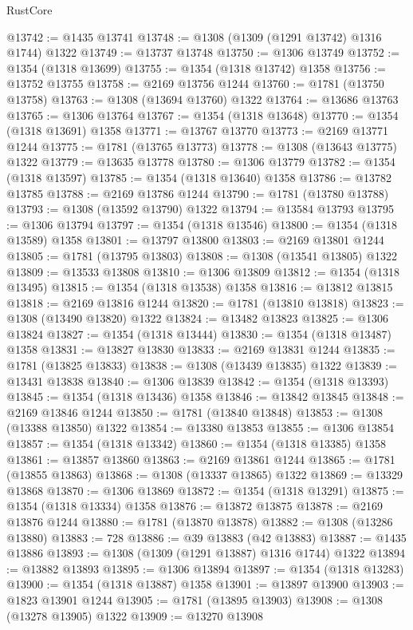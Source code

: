 \begin{lexlean}{RustCore}
\begin{coremodule}
@13742 := @1435 @13741
@13748 := @1308 (@1309 (@1291 @13742) @1316 @1744) @1322
@13749 := @13737 @13748
@13750 := @1306 @13749
@13752 := @1354 (@1318 @13699)
@13755 := @1354 (@1318 @13742) @1358
@13756 := @13752 @13755
@13758 := @2169 @13756 @1244
@13760 := @1781 (@13750 @13758)
@13763 := @1308 (@13694 @13760) @1322
@13764 := @13686 @13763
@13765 := @1306 @13764
@13767 := @1354 (@1318 @13648)
@13770 := @1354 (@1318 @13691) @1358
@13771 := @13767 @13770
@13773 := @2169 @13771 @1244
@13775 := @1781 (@13765 @13773)
@13778 := @1308 (@13643 @13775) @1322
@13779 := @13635 @13778
@13780 := @1306 @13779
@13782 := @1354 (@1318 @13597)
@13785 := @1354 (@1318 @13640) @1358
@13786 := @13782 @13785
@13788 := @2169 @13786 @1244
@13790 := @1781 (@13780 @13788)
@13793 := @1308 (@13592 @13790) @1322
@13794 := @13584 @13793
@13795 := @1306 @13794
@13797 := @1354 (@1318 @13546)
@13800 := @1354 (@1318 @13589) @1358
@13801 := @13797 @13800
@13803 := @2169 @13801 @1244
@13805 := @1781 (@13795 @13803)
@13808 := @1308 (@13541 @13805) @1322
@13809 := @13533 @13808
@13810 := @1306 @13809
@13812 := @1354 (@1318 @13495)
@13815 := @1354 (@1318 @13538) @1358
@13816 := @13812 @13815
@13818 := @2169 @13816 @1244
@13820 := @1781 (@13810 @13818)
@13823 := @1308 (@13490 @13820) @1322
@13824 := @13482 @13823
@13825 := @1306 @13824
@13827 := @1354 (@1318 @13444)
@13830 := @1354 (@1318 @13487) @1358
@13831 := @13827 @13830
@13833 := @2169 @13831 @1244
@13835 := @1781 (@13825 @13833)
@13838 := @1308 (@13439 @13835) @1322
@13839 := @13431 @13838
@13840 := @1306 @13839
@13842 := @1354 (@1318 @13393)
@13845 := @1354 (@1318 @13436) @1358
@13846 := @13842 @13845
@13848 := @2169 @13846 @1244
@13850 := @1781 (@13840 @13848)
@13853 := @1308 (@13388 @13850) @1322
@13854 := @13380 @13853
@13855 := @1306 @13854
@13857 := @1354 (@1318 @13342)
@13860 := @1354 (@1318 @13385) @1358
@13861 := @13857 @13860
@13863 := @2169 @13861 @1244
@13865 := @1781 (@13855 @13863)
@13868 := @1308 (@13337 @13865) @1322
@13869 := @13329 @13868
@13870 := @1306 @13869
@13872 := @1354 (@1318 @13291)
@13875 := @1354 (@1318 @13334) @1358
@13876 := @13872 @13875
@13878 := @2169 @13876 @1244
@13880 := @1781 (@13870 @13878)
@13882 := @1308 (@13286 @13880)
@13883 := 728
@13886 := @39 @13883 (@42 @13883)
@13887 := @1435 @13886
@13893 := @1308 (@1309 (@1291 @13887) @1316 @1744) @1322
@13894 := @13882 @13893
@13895 := @1306 @13894
@13897 := @1354 (@1318 @13283)
@13900 := @1354 (@1318 @13887) @1358
@13901 := @13897 @13900
@13903 := @1823 @13901 @1244
@13905 := @1781 (@13895 @13903)
@13908 := @1308 (@13278 @13905) @1322
@13909 := @13270 @13908

\end{coremodule}
\end{lexlean}
